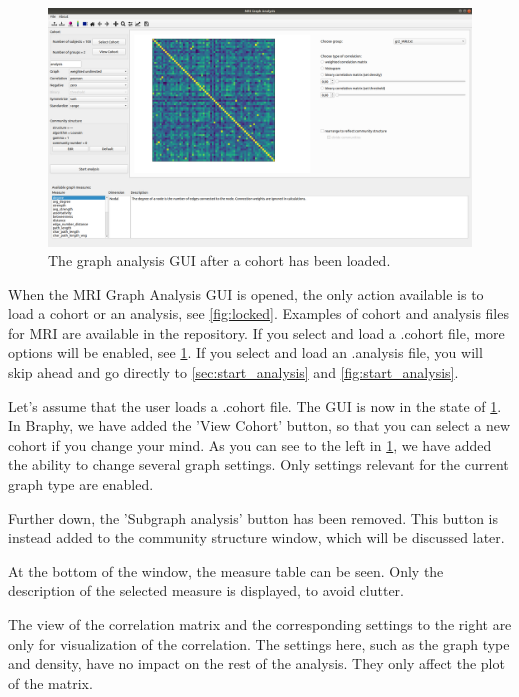 \documentclass{article}
\begin{document}
\begin{figure}[h]
    \centering
    \includegraphics[width=\linewidth]{graph_analysis_cohort.png}
    \caption{The graph analysis GUI after a cohort has been loaded.}
    \label{fig:started}
\end{figure}

When the MRI Graph Analysis GUI is opened, the only action available is to load a cohort or an analysis, see \cref{fig:locked}. Examples of cohort and analysis files for MRI are available in the repository. If you select and load a .cohort file, more options will be enabled, see \cref{fig:started}. If you select and load an .analysis file, you will skip ahead and go directly to \cref{sec:start_analysis} and \cref{fig:start_analysis}.

Let's assume that the user loads a .cohort file. The GUI is now in the state of \cref{fig:started}. In Braphy, we have added the 'View Cohort' button, so that you can select a new cohort if you change your mind. As you can see to the left in \cref{fig:started}, we have added the ability to change several graph settings. Only settings relevant for the current graph type are enabled. 

Further down, the 'Subgraph analysis' button has been removed. This button is instead added to the community structure window, which will be discussed later. 

At the bottom of the window, the measure table can be seen. Only the description of the selected measure is displayed, to avoid clutter.

The view of the correlation matrix and the corresponding settings to the right are only for visualization of the correlation. The settings here, such as the graph type and density, have no impact on the rest of the analysis. They only affect the plot of the matrix.
\end{document}
